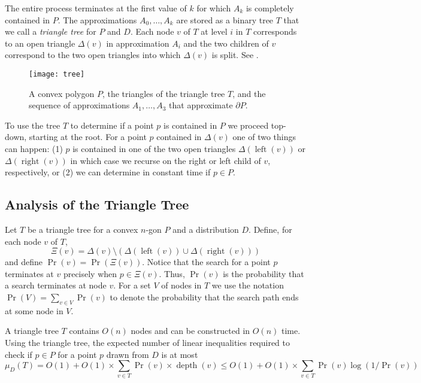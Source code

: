 \documentclass[charterfonts,lotsofwhite]{patmorin}
\newcommand{\boundary}{\partial}
\DeclareMathOperator{\depth}{depth}
\DeclareMathOperator{\lft}{left}
\DeclareMathOperator{\rght}{right}
\begin{document}
The entire process terminates at the first value of $k$ for which
$A_k$ is completely contained in $P$.  The approximations
$A_0,\ldots,A_k$ are stored as a binary tree $T$ that we call a
\emph{triangle tree} for $P$ and $D$.  Each node $v$ of $T$ at level
$i$ in $T$ corresponds to an open triangle $\Delta(v)$ in
approximation $A_{i}$ and the two children of $v$ correspond to the
two open triangles into which $\Delta(v)$ is split. See .

\begin{figure}
\begin{center}\texttt{[image: tree]}\end{center}
\caption{A convex polygon $P$, the triangles of the triangle 
tree $T$, and the sequence
of approximations $A_1,\ldots,A_3$ that approximate $\boundary P$.}
\end{figure}

To use the tree $T$ to determine if a point $p$ is contained in $P$ we
proceed top-down, starting at the root.  For a point $p$ contained in
$\Delta(v)$ one of two things can happen: (1) $p$ is contained in one
of the two open triangles $\Delta(\lft(v))$ or $\Delta(\rght(v))$ in
which case we recurse on the right or left child of $v$, respectively,
or (2) we can determine in constant time if $p\in P$.

\subsection{Analysis of the Triangle Tree}

Let $T$ be a triangle tree for a convex $n$-gon $P$ and a distribution
$D$. Define, for each node $v$ of $T$,
\[
   \Xi(v)=\Delta(v)\setminus (\Delta(\lft(v))\cup \Delta(\rght(v)))
\]
and define $\Pr(v)=\Pr(\Xi(v))$.  Notice that the search for a point
$p$ terminates at $v$ precisely when $p\in\Xi(v)$.  Thus, $\Pr(v)$ is
the probability that a search terminates at node $v$.  For a set $V$
of nodes in $T$ we use the notation $\Pr(V)=\sum_{v\in V}\Pr(v)$ to
denote the probability that the search path ends at some node in $V$.

\begin{thm}
A triangle tree $T$ contains $O(n)$ nodes and can be constructed in
$O(n)$ time.
Using the triangle tree, the expected number of linear inequalities
required to check if $p\in P$ for a point $p$ drawn from $D$ is at
most
\[
     \mu_D(T) = O(1)+O(1)\times \sum_{v\in T}\Pr(v)\times\depth (v)
      \le O(1)+O(1)\times \sum_{v\in T}\Pr(v)\log(1/\Pr(v))
\]
\end{thm}
\end{document}
